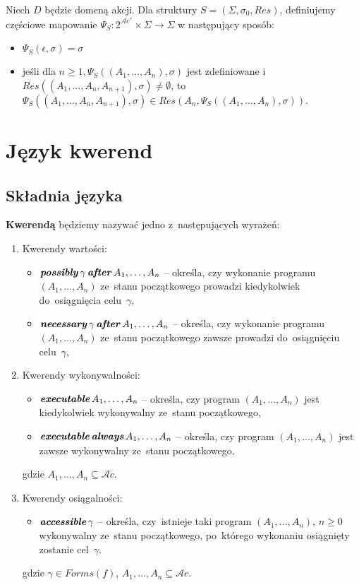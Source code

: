 \documentclass[11pt,a4paper]{article}
\DeclareMathOperator{\After}{\textbf{\textit{after}}}
\DeclareMathOperator{\Always}{\textbf{\textit{always}}}
\DeclareMathOperator{\Executable}{\textbf{\textit{executable}}}
\DeclareMathOperator{\Accessible}{\textbf{\textit{accessible}}}
\DeclareMathOperator{\Possibly}{\textbf{\textit{possibly}}}
\DeclareMathOperator{\Necessary}{\textbf{\textit{necessary}}}
\begin{document}

Niech $D$ będzie domeną akcji. Dla struktury $S = (\Sigma,\sigma_0,Res)$, definiujemy częściowe mapowanie 
$\Psi_S : 2^{\mathcal{A}c^*} \times \Sigma \rightarrow \Sigma$ w następujący sposób:
\begin{itemize}
\item $\Psi_S(\epsilon,\sigma) = \sigma$
\item jeśli dla $n \geq 1, \Psi_S((A_1,...,A_n),\sigma)$ jest zdefiniowane i $Res((A_1,...,A_n,A_{n+1}),\sigma) \neq \emptyset$, to $\Psi_S((A_1,...,A_n,A_{n+1}),\sigma) \in Res(A_n,\Psi_S((A_1,...,A_n),\sigma)).$
\end{itemize}

\section{Język kwerend}

\subsection{Składnia języka}

    \textbf{Kwerendą} będziemy nazywać jedno z~następujących wyrażeń:

    \begin{enumerate}
        \item Kwerendy wartości:
        \begin{itemize}            
            \item $\Possibly \gamma \After A_1, \dots, A_n$ -- określa, czy wykonanie programu $(A_1, \dots, A_n)$ ze~stanu początkowego prowadzi kiedykolwiek do~osiągnięcia celu~$\gamma$,
            \item $\Necessary \gamma \After A_1, \dots, A_n$ -- określa, czy wykonanie programu $(A_1, \dots, A_n)$ ze~stanu początkowego zawsze prowadzi do~osiągnięciu celu~$\gamma$,
        \end{itemize}
        \item Kwerendy wykonywalności:
        \begin{itemize}
            \item $\Executable A_1, \dots, A_n$ -- określa, czy program $(A_1, \dots, A_n)$ jest kiedykolwiek wykonywalny ze~stanu początkowego,
            \item $\Executable \Always A_1, \dots, A_n$ -- określa, czy program $(A_1, \dots, A_n)$ jest zawsze wykonywalny ze~stanu początkowego,
        \end{itemize}
        gdzie $A_1, \dots, A_n \subseteq \mathcal{A}c$.
        \item Kwerendy osiągalności:
        \begin{itemize}
            \item $\Accessible \gamma$ -- określa, czy~istnieje taki program $(A_1, \dots, A_n)$, $n \geq 0$ wykonywalny ze~stanu początkowego, po~którego wykonaniu osiągnięty zostanie cel~$\gamma$.
        \end{itemize}
        gdzie $\gamma \in Forms(f)$, $A_1, \dots, A_n \subseteq \mathcal{A}c$.
    \end{enumerate}
\end{document}
